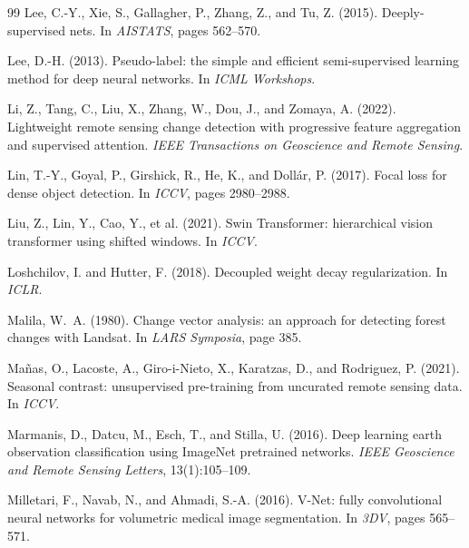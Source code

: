 \documentclass[12pt,a4paper]{article}
\begin{document}
\begin{thebibliography}{99}
Lee, C.-Y., Xie, S., Gallagher, P., Zhang, Z., and Tu, Z. (2015).
\newblock Deeply-supervised nets.
\newblock In \textit{AISTATS}, pages 562--570.

Lee, D.-H. (2013).
\newblock Pseudo-label: the simple and efficient semi-supervised learning method for deep neural networks.
\newblock In \textit{ICML Workshops}.

Li, Z., Tang, C., Liu, X., Zhang, W., Dou, J., and Zomaya, A. (2022).
\newblock Lightweight remote sensing change detection with progressive feature aggregation and supervised attention.
\newblock \textit{IEEE Transactions on Geoscience and Remote Sensing}.

Lin, T.-Y., Goyal, P., Girshick, R., He, K., and Dollár, P. (2017).
\newblock Focal loss for dense object detection.
\newblock In \textit{ICCV}, pages 2980--2988.

Liu, Z., Lin, Y., Cao, Y., et al. (2021).
\newblock Swin Transformer: hierarchical vision transformer using shifted windows.
\newblock In \textit{ICCV}.

Loshchilov, I. and Hutter, F. (2018).
\newblock Decoupled weight decay regularization.
\newblock In \textit{ICLR}.

Malila, W.~A. (1980).
\newblock Change vector analysis: an approach for detecting forest changes with Landsat.
\newblock In \textit{LARS Symposia}, page 385.

Mañas, O., Lacoste, A., Giro-i-Nieto, X., Karatzas, D., and Rodriguez, P. (2021).
\newblock Seasonal contrast: unsupervised pre-training from uncurated remote sensing data.
\newblock In \textit{ICCV}.

Marmanis, D., Datcu, M., Esch, T., and Stilla, U. (2016).
\newblock Deep learning earth observation classification using ImageNet pretrained networks.
\newblock \textit{IEEE Geoscience and Remote Sensing Letters}, 13(1):105--109.

Milletari, F., Navab, N., and Ahmadi, S.-A. (2016).
\newblock V-Net: fully convolutional neural networks for volumetric medical image segmentation.
\newblock In \textit{3DV}, pages 565--571.


\end{thebibliography}
\end{document}
